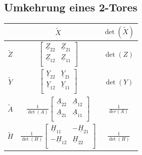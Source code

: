 \subsection{Umkehrung eines 2-Tores}
	\renewcommand{\arraystretch}{1.1}
		\begin{tabular}{| c | c | c |}
			\hline
				\textbf{}
				& \textbf{$\tilde{X}$}
				& \textbf{$\det(\tilde{X})$}\\
			\hline
				\textbf{$\tilde{Z}$}
				& $\begin{bmatrix}
						\underline{Z}_{22} & \underline{Z}_{21} \\
						\underline{Z}_{12} & \underline{Z}_{11} \\
					\end{bmatrix}$
				& $\det(Z)$\\
			\hline
				\textbf{$\tilde{Y}$}
				& $\begin{bmatrix}
						\underline{Y}_{22} & \underline{Y}_{21} \\
						\underline{Y}_{12} & \underline{Y}_{11} \\
					\end{bmatrix}$
				& $\det(Y)$\\
			\hline
				\textbf{$\tilde{A}$}
				& $\frac{1}{\det(A)} 
					\begin{bmatrix}
						\underline{A}_{22} & \underline{A}_{12} \\
						\underline{A}_{21} & \underline{A}_{11} \\
					\end{bmatrix}$
				& $\frac{1}{der(A)}$\\
			\hline
				\textbf{$\tilde{H}$}
				& $\frac{1}{\det(H)} 
					\begin{bmatrix}
						\underline{H}_{11} & -\underline{H}_{21} \\
						-\underline{H}_{12} & \underline{H}_{22} \\
					\end{bmatrix}$
				& $\frac{1}{\det(H)}$\\
			\hline
		\end{tabular}
	\renewcommand{\arraystretch}{\arraystretchOriginal}
	
	
	

		